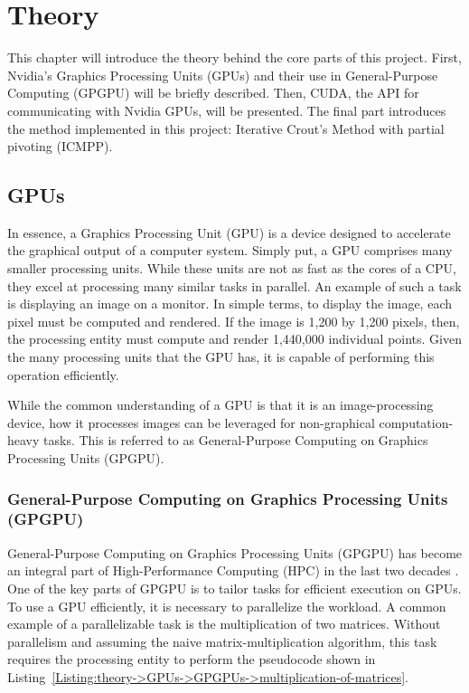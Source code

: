 \chapter{Theory}

This chapter will introduce the theory behind the core parts of this project.
First, Nvidia's Graphics Processing Units (GPUs) and their use in General-Purpose Computing (GPGPU) will be briefly described.
Then, CUDA, the API for communicating with Nvidia GPUs, will be presented.
The final part introduces the method implemented in this project: Iterative Crout's Method with partial pivoting (ICMPP).

\section{GPUs}\label{Section:theory->GPUs}
In essence, a Graphics Processing Unit (GPU) is a device designed to accelerate the graphical output of a computer system.
Simply put, a GPU comprises many smaller processing units.
While these units are not as fast as the cores of a CPU, they excel at processing many similar tasks in parallel.
An example of such a task is displaying an image on a monitor.
In simple terms, to display the image, each pixel must be computed and rendered.
If the image is 1,200 by 1,200 pixels, then, the processing entity must compute and render 1,440,000 individual points.
Given the many processing units that the GPU has, it is capable of performing this operation efficiently.

While the common understanding of a GPU is that it is an image-processing device, how it processes images can be leveraged for non-graphical computation-heavy tasks.
This is referred to as General-Purpose Computing on Graphics Processing Units (GPGPU).

\subsection{General-Purpose Computing on Graphics Processing Units (GPGPU)}\label{Subsection:theory->GPUs->GPGPU}
General-Purpose Computing on Graphics Processing Units (GPGPU) has become an integral part of High-Performance Computing (HPC) in the last two decades \cite{Cejka2020, Cejka2022}.
One of the key parts of GPGPU is to tailor tasks for efficient execution on GPUs.
To use a GPU efficiently, it is necessary to parallelize the workload.
A common example of a parallelizable task is the multiplication of two matrices.
Without parallelism and assuming the naive matrix-multiplication algorithm, this task requires the processing entity to perform the pseudocode shown in Listing~\ref{Listing:theory->GPUs->GPGPUs->multiplication-of-matrices}.

